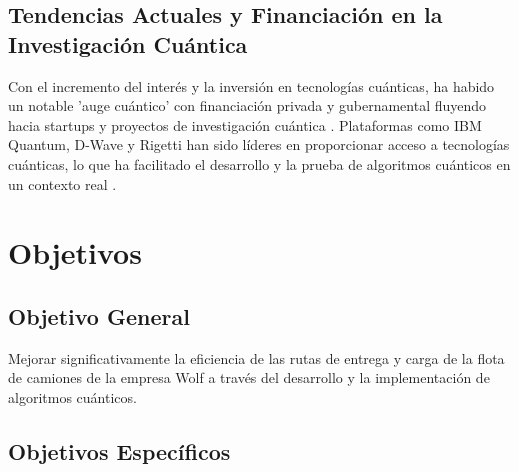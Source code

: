\documentclass[11pt,a4paper,spanish]{book}
\begin{document}
\section{Tendencias Actuales y Financiación en la Investigación Cuántica}

Con el incremento del interés y la inversión en tecnologías cuánticas, ha habido un notable 'auge cuántico' con financiación privada y gubernamental fluyendo hacia startups y proyectos de investigación cuántica \citep{quantumTech}. Plataformas como IBM Quantum, D-Wave y Rigetti han sido líderes en proporcionar acceso a tecnologías cuánticas, lo que ha facilitado el desarrollo y la prueba de algoritmos cuánticos en un contexto real \citep{qiskit, dwaveOcean}.

\chapter{Objetivos}

\section{Objetivo General}
Mejorar significativamente la eficiencia de las rutas de entrega y carga de la flota de camiones de la empresa Wolf a través del desarrollo y la implementación de algoritmos cuánticos.

\section{Objetivos Específicos}
\end{document}
